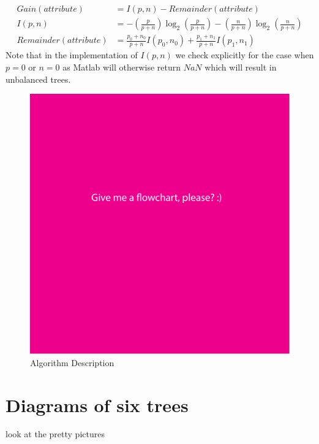 \documentclass[11pt,a4paper]{article}
\begin{document}
\begin{align}
Gain(attribute)  &= I(p,n) - Remainder(attribute)\\
I(p,n) &= -\left(\frac{p}{p+n}\right)\log_2{\left(\frac{p}{p+n}\right)} -\left(\frac{n}{p+n}\right)\log_2{\left(\frac{n}{p+n}\right)}\\
Remainder(attribute) &= \frac{p_0 + n_0}{p+n}I(p_0,n_0) + \frac{p_1 + n_1}{p + n}I(p_1,n_1)
\end{align}
Note that in the implementation of $I(p,n)$ we check explicitly for the case when $p = 0$ or $n = 0$ as Matlab will otherwise return $NaN$ which will result in unbalanced trees.

\begin{figure}[!ht]
\centering
\includegraphics[scale=0.7]{images/flowchart.pdf}
\caption{Algorithm Description}
\label{fig:flowchart}
\end{figure}

\section{Diagrams of six trees}

look at the pretty pictures
\end{document}
